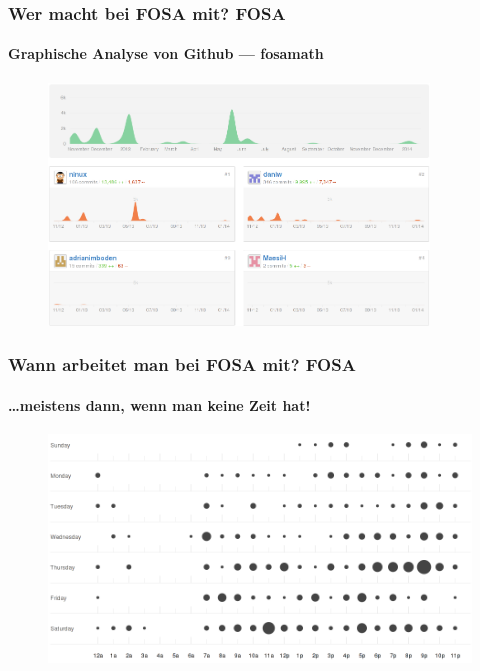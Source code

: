 \begin{frame}
	\frametitle{Wer macht bei FOSA mit? \hfill{} \footnotesize{FOSA}}
	\framesubtitle{Graphische Analyse von Github --- fosamath}
	\begin{figure}
		\centering
		\includegraphics[width=0.9\textwidth]{fosamath-additions.png}
	\end{figure}
\end{frame}

\begin{frame}
	\frametitle{Wann arbeitet man bei FOSA mit? \hfill{} \footnotesize{FOSA}}
	\framesubtitle{\dots meistens dann, wenn man keine Zeit hat!}
	\begin{figure}
		\centering
		\includegraphics[width=1\textwidth]{fosamath-punchcard.png}
	\end{figure}
\end{frame}

